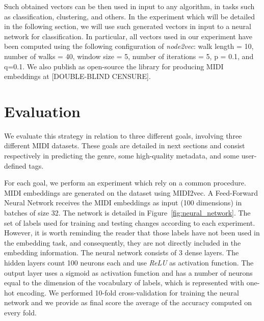 \documentclass{article}
\newcommand{\figref}[1]{\mbox{Figure~\ref{#1}}}
\begin{document}
Such obtained vectors can be then used in input to any algorithm, in tasks such as classification, clustering, and others. In the experiment which will be detailed in the following section, we will use such generated vectors in input to a neural network for classification.
In particular, all vectors used in our experiment have been computed using the following configuration of \textit{node2vec}: walk length = 10, number of walks = 40, window size = 5, number of iterations = 5, p = 0.1, and q=0.1. We also publish as open-source the library for producing MIDI embeddings at [DOUBLE-BLIND CENSURE].

\section{Evaluation}
\label{sec:evaluation}
We evaluate this strategy in relation to three different goals, involving three different MIDI datasets. These goals are detailed in next sections and consist respectively in predicting the genre, some high-quality metadata, and some user-defined tags.

For each goal, we perform an experiment which rely on a common procedure. 
MIDI embeddings are generated on the dataset using MIDI2vec. A Feed-Forward Neural Network receives the MIDI embeddings as input (100 dimensions) in batches of size 32. The network is detailed in \figref{fig:neural_network}. The set of labels used for training and testing changes according to each experiment. However, it is worth reminding the reader that those labels have not been used in the embedding task, and consequently, they are not directly included in the embedding information. The neural network consists of 3 dense layers. The hidden layers count 100 neurons each and use \textit{ReLU} as activation function. The output layer uses a sigmoid as activation function and has a number of neurons equal to the dimension of the vocabulary of labels, which is represented with one-hot encoding. We performed 10-fold cross-validation for training the neural network and we provide as final score the average of the accuracy computed on every fold.
\end{document}
